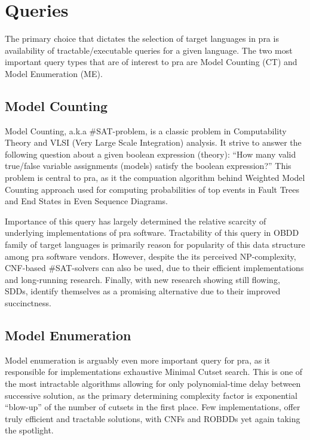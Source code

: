 \section{Queries}
The primary choice that dictates the selection of target languages in \acrshort{pra} is availability of tractable/executable queries for a given language. The two most important query types that are of interest to \acrshort{pra} are Model Counting (CT) and Model Enumeration (ME).

\subsection{Model Counting}
Model Counting, a.k.a $\#$SAT-problem, is a classic problem in Computability Theory and VLSI (Very Large Scale Integration) analysis. It strive to answer the following question about a given boolean expression (theory): ``How many valid true/false variable assignments (models) satisfy the boolean expression?'' This problem is central to \acrshort{pra}, as it the compuation algorithm behind Weighted Model Counting approach used for computing probabilities of top events in Fault Trees and End States in Even Sequence Diagrams. 

Importance of this query has largely determined the relative scarcity of underlying implementations of \acrshort{pra} software. Tractability of this query in OBDD family of target languages is primarily reason for popularity of this data structure among \acrshort{pra} software vendors. However, despite the its perceived NP-complexity, CNF-based $\#$SAT-solvers can also be used, due to their efficient implementations and long-running research. Finally, with new research showing still flowing, SDDs, identify themselves as a promising alternative due to their improved succinctness.

\subsection{Model Enumeration}
Model enumeration is arguably even more important query for \acrshort{pra}, as it responsible for implementations exhaustive Minimal Cutset search. This is one of the most intractable algorithms allowing for only polynomial-time delay between successive solution, as the primary determining complexity factor is exponential ``blow-up'' of the number of cutsets in the first place. Few implementations, offer truly efficient and tractable solutions, with CNFs and ROBDDs yet again taking the spotlight.


% 
